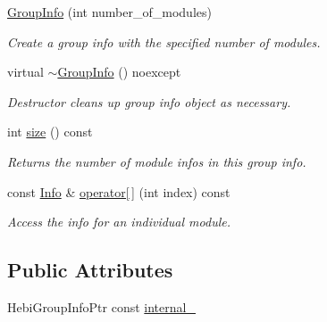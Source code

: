 \begin{DoxyCompactItemize}
\item 
\hyperlink{classhebi_1_1GroupInfo_adb2618d3baaadb15328d04427e64d9fc}{Group\+Info} (int number\+\_\+of\+\_\+modules)\hypertarget{classhebi_1_1GroupInfo_adb2618d3baaadb15328d04427e64d9fc}{}\label{classhebi_1_1GroupInfo_adb2618d3baaadb15328d04427e64d9fc}

\begin{DoxyCompactList}\small\item\em Create a group info with the specified number of modules. \end{DoxyCompactList}\item 
virtual \hyperlink{classhebi_1_1GroupInfo_a2bdd19dd45afff8c0d6a3e212f0a75e6}{$\sim$\+Group\+Info} () noexcept\hypertarget{classhebi_1_1GroupInfo_a2bdd19dd45afff8c0d6a3e212f0a75e6}{}\label{classhebi_1_1GroupInfo_a2bdd19dd45afff8c0d6a3e212f0a75e6}

\begin{DoxyCompactList}\small\item\em Destructor cleans up group info object as necessary. \end{DoxyCompactList}\item 
int \hyperlink{classhebi_1_1GroupInfo_a197165d1017e42ebbf4f9c527bb1b706}{size} () const \hypertarget{classhebi_1_1GroupInfo_a197165d1017e42ebbf4f9c527bb1b706}{}\label{classhebi_1_1GroupInfo_a197165d1017e42ebbf4f9c527bb1b706}

\begin{DoxyCompactList}\small\item\em Returns the number of module infos in this group info. \end{DoxyCompactList}\item 
const \hyperlink{classhebi_1_1Info}{Info} \& \hyperlink{classhebi_1_1GroupInfo_a3b1fed2ae8cefc7306a07fd39aab3a2f}{operator\mbox{[}$\,$\mbox{]}} (int index) const \hypertarget{classhebi_1_1GroupInfo_a3b1fed2ae8cefc7306a07fd39aab3a2f}{}\label{classhebi_1_1GroupInfo_a3b1fed2ae8cefc7306a07fd39aab3a2f}

\begin{DoxyCompactList}\small\item\em Access the info for an individual module. \end{DoxyCompactList}\end{DoxyCompactItemize}
\subsection*{Public Attributes}
\begin{DoxyCompactItemize}
\item 
Hebi\+Group\+Info\+Ptr const \hyperlink{classhebi_1_1GroupInfo_a35246a60a176870a343eb109e85fcfdf}{internal\+\_\+}
\end{DoxyCompactItemize}


